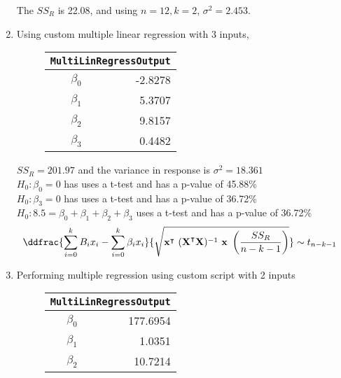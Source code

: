 \begin{enumerate}
The $ SS_R $ is 22.08, and using $ n = 12, k = 2 $, $ \sigma^2 = 2.453 $.

\item Using custom multiple linear regression with 3 inputs,

\begin{figure}[H]
	\centering
	\begin{tabular}{@{}rr@{}}
		\toprule
		\multicolumn{2}{c}{\texttt{MultiLinRegressOutput}} \\
		\midrule
		$\beta_0$ &          -2.8278 \\
		$\beta_1$ &           5.3707 \\
		$\beta_2$ &           9.8157 \\
		$\beta_3$ &           0.4482 \\
		\bottomrule
	\end{tabular}
	
\end{figure}

$ SS_R = 201.97 $ and the variance in response is $ \sigma^2 = 18.361 $\\
$ H_0 : \beta_0 = 0 $ has uses a t-test and has a p-value of 45.88\% \\
$ H_0 : \beta_3 = 0 $ has uses a t-test and has a p-value of 36.72\% \\
$ H_0 : 8.5 = \beta_0 + \beta_1 + \beta_2 + \beta_3 $ uses a t-test and has a p-value of 36.72\% \\

\begin{align}
	\ddfrac{\sum\limits_{i = 0}^{k} B_i x_i - \sum\limits_{i = 0}^{k} \beta_i x_i}{\sqrt{\textbf{x}^\intercal \ (\textbf{X}^\intercal \textbf{X})^{-1}\ \textbf{x}\ \left(\frac{SS_R}{n-k-1}\right)}} &\sim t_{n-k-1}
\end{align}

\item  Performing multiple regression using custom script with 2 inputs\\

\begin{figure}[H]
	\centering
	\begin{tabular}{@{}rr@{}}
		\toprule
		\multicolumn{2}{c}{\texttt{MultiLinRegressOutput}} \\
		\midrule
		$\beta_0$ &         177.6954 \\
		$\beta_1$ &           1.0351 \\
		$\beta_2$ &          10.7214 \\
		\bottomrule
	\end{tabular}
\end{figure}


\end{enumerate}
